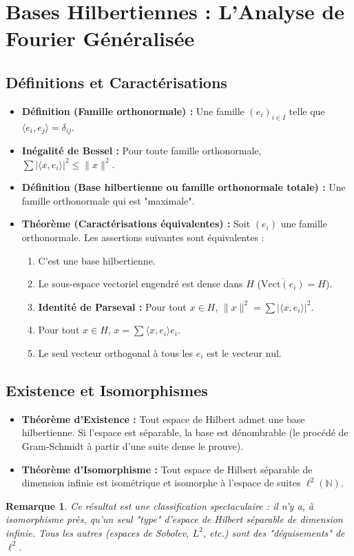 \documentclass[12pt, a4paper, parskip=full]{report}
\theoremstyle{agregstyle}
\newtheorem{remark}[definition]{Remarque}
\begin{document}
\section{Bases Hilbertiennes : L'Analyse de Fourier Généralisée}

\subsection{Définitions et Caractérisations}
\begin{itemize}
    \item \textbf{Définition (Famille orthonormale) :} Une famille $(e_i)_{i \in I}$ telle que $\langle e_i, e_j \rangle = \delta_{ij}$.
    \item \textbf{Inégalité de Bessel :} Pour toute famille orthonormale, $\sum |\langle x, e_i \rangle|^2 \le \|x\|^2$.
    \item \textbf{Définition (Base hilbertienne ou famille orthonormale totale) :} Une famille orthonormale qui est "maximale".
    \item \textbf{Théorème (Caractérisations équivalentes) :} Soit $(e_i)$ une famille orthonormale. Les assertions suivantes sont équivalentes :
        \begin{enumerate}
            \item C'est une base hilbertienne.
            \item Le sous-espace vectoriel engendré est dense dans $H$ ($\overline{\mathrm{Vect}(e_i)} = H$).
            \item \textbf{Identité de Parseval :} Pour tout $x \in H$, $\|x\|^2 = \sum |\langle x, e_i \rangle|^2$.
            \item Pour tout $x \in H$, $x = \sum \langle x, e_i \rangle e_i$.
            \item Le seul vecteur orthogonal à tous les $e_i$ est le vecteur nul.
        \end{enumerate}
\end{itemize}

\subsection{Existence et Isomorphismes}
\begin{itemize}
    \item \textbf{Théorème d'Existence :} Tout espace de Hilbert admet une base hilbertienne. Si l'espace est séparable, la base est dénombrable (le procédé de Gram-Schmidt à partir d'une suite dense le prouve).
    \item \textbf{Théorème d'Isomorphisme :} Tout espace de Hilbert séparable de dimension infinie est isométrique et isomorphe à l'espace de suites $\ell^2(\mathbb{N})$.
\end{itemize}
\begin{remark}
    Ce résultat est une classification spectaculaire : il n'y a, à isomorphisme près, qu'un seul "type" d'espace de Hilbert séparable de dimension infinie. Tous les autres (espaces de Sobolev, $L^2$, etc.) sont des "déguisements" de $\ell^2$.
\end{remark}
\end{document}
